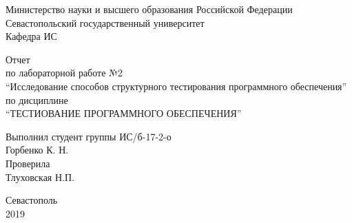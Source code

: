\documentclass[a4paper,14pt]{extarticle}
\newcommand{\mylabnumber}{2}
\newcommand{\mylabtitle}{Исследование способов структурного
    тестирования программного обеспечения}
\newcommand{\mysubject}{Тестиование программного обеспечения}
\newcommand{\mylecturer}{Тлуховская Н.П.}
\begin{document}
    \lstset{ %
        basicstyle=\footnotesize\ttfamily,
        breaklines=true,
        numbersep=5pt,
        tabsize=4,
        gobble=8,
        extendedchars=\true,
        keepspaces=\true,
        numbers=left,
        stringstyle=\ttfamily,
        showstringspaces=\false
    }


    \begin{titlepage}
        
        \thispagestyle{empty}
        
        \begin{center}
            
            Министерство науки и высшего образования Российской Федерации \\
            Севастопольский государственный университет \\
            Кафедра ИС
            
            \vfill

            Отчет \\
            по лабораторной работе №\mylabnumber \\
            \enquote{\mylabtitle} \\
            по дисциплине \\
            \enquote{\MakeTextUppercase{\mysubject}}

        \end{center}

        \vspace{1cm}

        \noindent\hspace{7.5cm} Выполнил студент группы ИС/б-17-2-о \\
        \null\hspace{7.5cm} Горбенко К. Н. \\
        \null\hspace{7.5cm} Проверила \\
        \null\hspace{7.5cm} \mylecturer

        \vfill

        \begin{center}
            Севастополь \\
            2019
        \end{center}

    \end{titlepage}
\end{document}
